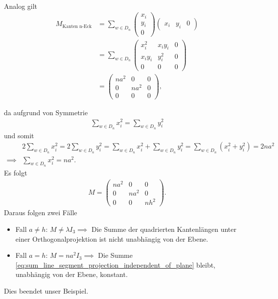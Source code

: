 \begin{example}
\begin{align}
    \end{align}
    Analog gilt
    \begin{align}
        M_{\text{Kanten n-Eck}} &= \sum_{w \in D_n}\begin{pmatrix} x_i \\ y_i \\ 0 \end{pmatrix} \begin{pmatrix} x_i & y_i & 0 \end{pmatrix} \nonumber \\
        &= \sum_{w \in D_n}\begin{pmatrix} x_i^2 & x_i y_i & 0 \\ x_i y_i & y_i^2 & 0 \\ 0 & 0 & 0 \end{pmatrix} \nonumber \\
        &= \begin{pmatrix} n  a^2 & 0 & 0 \\ 0 & n  a^2 & 0 \\ 0 & 0 & 0 \end{pmatrix}, \nonumber
    \end{align}

    da aufgrund von Symmetrie 
    \begin{align}
        \sum_{w \in D_n} x_i^2 = \sum_{w \in D_n}  y_i^2 \nonumber 
    \end{align}
    und somit 
    \begin{align}
        &2\sum_{w \in D_n} x_i^2 = 2 \sum_{w \in D_n} y_i^2 = 
            \sum_{w \in D_n} x_i^2 + \sum_{w \in D_n} y_i^2 = \sum_{w \in D_n} (x_i^2 +y_i^2) = 2na^2\nonumber \\
            \implies &\sum_{w \in D_n} x_i^2 = na^2. \nonumber
    \end{align}
    Es folgt
    \begin{align}
        M = \begin{pmatrix} n  a^2 & 0 & 0 \\ 0 & n  a^2 & 0 \\ 0 & 0 & nh^2 \end{pmatrix}. \nonumber
    \end{align}
    Daraus folgen zwei Fälle
    \begin{itemize}
        \item Fall $a \neq h$: $M \neq \lambda I_3 \implies $ Die Summe der quadrierten Kantenlängen unter einer Orthogonalprojektion ist nicht unabhängig von der Ebene.
        \item Fall $a = h$: $M = na^2 I_3 \implies $ Die Summe \eqref{eq:sum_line_segment_projection_independent_of_plane} bleibt, unabhängig von der Ebene, konstant.
    \end{itemize}
    Dies beendet unser Beispiel.
\end{example}


